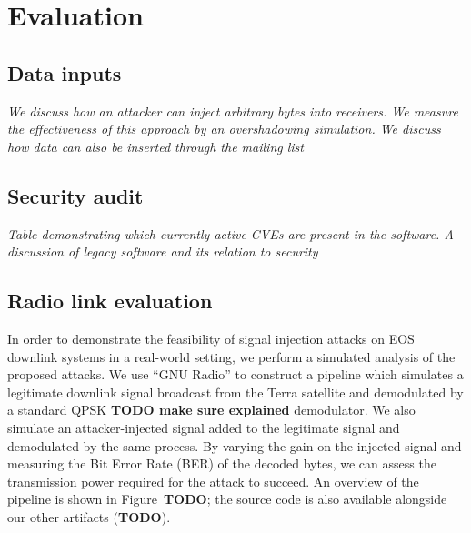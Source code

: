 \section{Evaluation}\label{sec:evaluation}

\subsection{Data inputs}

\textit{We discuss how an attacker can inject arbitrary bytes into receivers.  We measure the effectiveness of this approach by an overshadowing simulation.  We discuss how data can also be inserted through the mailing list}

\subsection{Security audit}
\textit{Table demonstrating which currently-active CVEs are present in the software. A discussion of legacy software and its relation to security}

\subsection{Radio link evaluation}

In order to demonstrate the feasibility of signal injection attacks on EOS downlink systems in a real-world setting, we perform a simulated analysis of the proposed attacks.
We use ``GNU Radio'' to construct a pipeline which simulates a legitimate downlink signal broadcast from the Terra satellite and demodulated by a standard QPSK \textbf{TODO make sure explained} demodulator.
We also simulate an attacker-injected signal added to the legitimate signal and demodulated by the same process.
By varying the gain on the injected signal and measuring the Bit Error Rate (BER) of the decoded bytes, we can assess the transmission power required for the attack to succeed.
An overview of the pipeline is shown in Figure~\textbf{TODO}; the source code is also available alongside our other artifacts (\textbf{TODO}).

